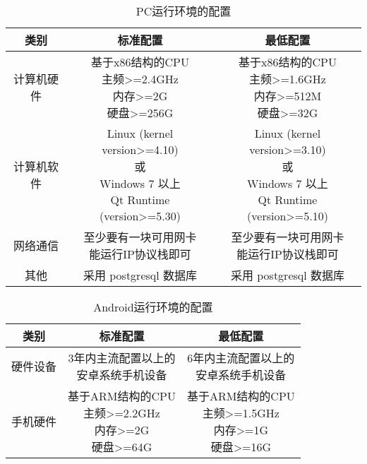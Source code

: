 \begin{table}[htbp]
\centering
\caption{PC运行环境的配置} 
\begin{tabular}{|c|c|c|}
    \hline
    类别 & 标准配置 & 最低配置 \\
    \hline
    计算机硬件 & \tabincell{c}{基于x86结构的CPU\\ 主频>=2.4GHz\\ 内存>=2G\\ 硬盘>=256G} & \tabincell{c}{基于x86结构的CPU\\ 主频>=1.6GHz\\ 内存>=512M\\ 硬盘>=32G} \\
    \hline
    计算机软件 & 
    \tabincell{c} {
        Linux (kernel version>=4.10)\\ 
        或\\
        Windows 7 以上\\
        Qt Runtime (version>=5.30)\\
        } & 
    \tabincell{c} {
        Linux (kernel version>=3.10)\\ 
                或\\
        Windows 7 以上\\
        Qt Runtime (version>=5.10)\\
        } \\
    \hline
    网络通信 & \tabincell{c}{至少要有一块可用网卡\\ 能运行IP协议栈即可} & \tabincell{c}{至少要有一块可用网卡\\ 能运行IP协议栈即可} \\
    \hline
    其他 & 采用 postgresql 数据库 & 采用 postgresql 数据库 \\
    \hline
\end{tabular}
\end{table}

\begin{table}[htbp]
\centering
\caption{Android运行环境的配置} \label{tab:iostest-environment}
\begin{tabular}{|c|c|c|}
    \hline
    类别 & 标准配置 & 最低配置 \\
    \hline
    硬件设备 & \tabincell{c}{
        3年内主流配置以上的\\
        安卓系统手机设备
    } & \tabincell{c}{
        6年内主流配置以上的\\
        安卓系统手机设备
    } \\
    \hline
        手机硬件 & 
        \tabincell{c}{
            基于ARM结构的CPU\\ 
            主频>=2.2GHz\\ 
            内存>=2G\\ 
            硬盘>=64G} & 
        \tabincell{c}{
            基于ARM结构的CPU\\ 
            主频>=1.5GHz\\ 
            内存>=1G\\ 
            硬盘>=16G} \\
    \hline
\end{tabular}
\end{table}

